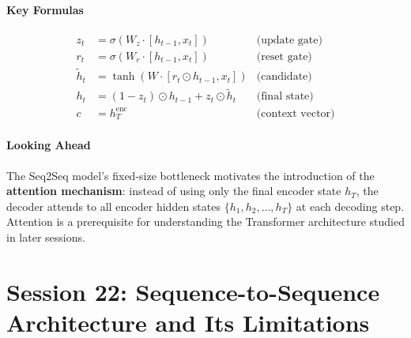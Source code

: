 \documentclass[12pt,a4paper]{article}
\begin{document}
\subsection{Key Formulas}

\begin{align*}
  z_t &= \sigma(W_z\cdot[h_{t-1},x_t]) & \text{(update gate)}\\
  r_t &= \sigma(W_r\cdot[h_{t-1},x_t]) & \text{(reset gate)}\\
  \tilde{h}_t &= \tanh(W\cdot[r_t\odot h_{t-1},x_t]) & \text{(candidate)}\\
  h_t &= (1-z_t)\odot h_{t-1} + z_t\odot\tilde{h}_t & \text{(final state)}\\
  c &= h_T^{\text{enc}} & \text{(context vector)}
\end{align*}

\subsection{Looking Ahead}

The Seq2Seq model's fixed-size bottleneck motivates the introduction of the
\textbf{attention mechanism}: instead of using only the final encoder state $h_T$, the decoder
attends to all encoder hidden states $\{h_1, h_2, \ldots, h_T\}$ at each decoding step.
Attention is a prerequisite for understanding the Transformer architecture studied in later sessions.

\clearpage

\part{Session 22: Sequence-to-Sequence Architecture and Its Limitations}


\begin{abstract}
This document is a comprehensive set of notes for Session~22 of the Deep Learning course at IIITDwd.
The session covers the motivation for sequence-to-sequence (Seq2Seq) models, the encoder--decoder
architecture built on LSTM units, the autoregressive inference procedure (teacher forcing vs.\ greedy
decoding), and the critical limitations that arise from compressing an entire source sequence into a
single fixed-size context vector. The final part of the session presents a hands-on PyTorch
implementation of Seq2Seq for English-to-Hindi machine translation.
These limitations directly motivate the attention mechanism introduced in Session~24.
\end{abstract}
\end{document}
